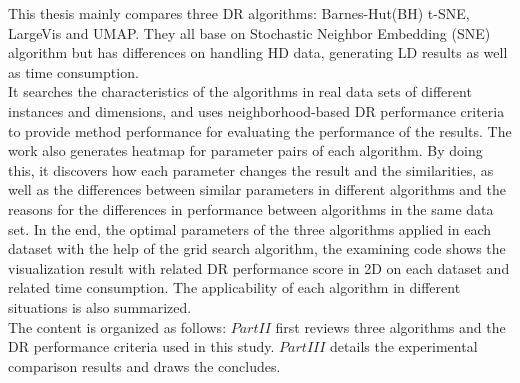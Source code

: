 \noindent This thesis mainly compares three DR algorithms: Barnes-Hut(BH) t-SNE\cite{ref9}, LargeVis and UMAP. They all base on Stochastic Neighbor Embedding (SNE)\cite{ref15} algorithm but has differences on handling HD data, generating LD results as well as time consumption.\\

\noindent It searches the characteristics of the algorithms in real data sets of different instances and dimensions, and uses neighborhood-based DR performance criteria to provide method performance for evaluating the performance of the results\cite{ref4}. The work also generates heatmap for parameter pairs of each algorithm. By doing this, it discovers how each parameter changes the result and the similarities, as well as the differences between similar parameters in different algorithms and the reasons for the differences in performance between algorithms in the same data set. In the end, the optimal parameters of the three algorithms applied in each dataset with the help of the grid search algorithm, the examining code shows the visualization result with related DR performance score in 2D on each dataset  and related time consumption. The applicability of each algorithm in different situations is also summarized.\\

\noindent The content is organized as follows: $Part II$ first reviews three algorithms and the DR performance criteria used in this study. $Part III$ details the experimental comparison results and draws the concludes.


